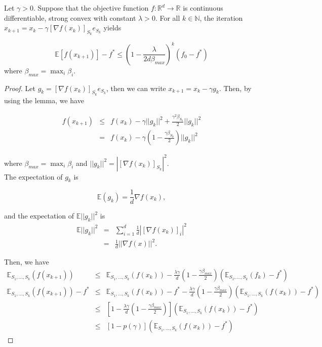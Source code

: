 \documentclass[12pt]{report}
\begin{document}
\begin{theorem}
Let $\gamma >0$. Suppose that the objective function $f: \mathbb{R}^d \to \mathbb{R}$ is continuous differentiable, strong convex with constant $\lambda >0$. For all $k \in \mathbb{N}$, the iteration $x_{k+1} = x_{k} - \gamma [\nabla f(x_k)]_{S_k} e_{S_k}$ yields 

$$\mathbb{E} [f(x_{k+1})]-f^* \leq (1- \frac{\lambda}{2d \beta_{max}})^k (f_0-f^*)$$
where $\beta_{max} = \max_i \beta_i$.

\end{theorem}


\begin{proof}
Let $g_k = [\nabla f(x_k)]_{S_k} e_{S_k}$, then we can write $x_{k+1} = x_{k} - \gamma g_k$.
Then, by using the lemma, we have

\begin{eqnarray*}
f(x_{k+1}) &\leq& f(x_k) - \gamma ||g_k||^2 + \frac{\gamma^2\beta_{S_k}}{2} ||g_k||^2\\
 & = & f(x_k) - \gamma (1-\frac{\gamma \beta_{S_k}}{2}) ||g_k||^2
\end{eqnarray*}

where $\beta_{max} = \max_i \beta_i$ and $||g_k||^2 = |[\nabla f(x_k)]_{S_k}|^2.$\\

The expectation of $g_k$ is

$$\mathbb{E} (g_k) =\frac{1}{d} \nabla f(x_k),$$

and the expectation of $\mathbb{E} ||g_k||^2$ is
\begin{eqnarray*}
\mathbb{E} ||g_k||^2 &=& \sum_{i=1}^d \frac{1}{d} |[\nabla f(x_k)]_i|^2\\
&=&\frac{1}{d}||\nabla f(x)||^2.
\end{eqnarray*}

Then, we have
\begin{eqnarray*}
\mathbb{E}_{S_1,\dots, S_k} (f(x_{k+1}))&\leq& \mathbb{E}_{S_1,\dots, S_k}  (f(x_k)) - \frac{\lambda \gamma}{d} (1- \frac{\gamma \beta_{max}}{2}) (\mathbb{E}_{S_1,\dots, S_k} (f_k) - f^*)\\
\mathbb{E}_{S_1,\dots, S_k} (f(x_{k+1})) -f^* &\leq& \mathbb{E}_{S_1,\dots, S_k}  (f(x_k)) -f^*- \frac{\lambda \gamma}{d} (1- \frac{\gamma \beta_{max}}{2}) (\mathbb{E}_{S_1,\dots, S_k} (f(x_k)) - f^*)\\
&\leq& [1- \frac{\lambda \gamma}{d} (1- \frac{\gamma \beta_{max}}{2})] (\mathbb{E}_{S_1,\dots, S_k} (f(x_k)) - f^*)\\
&\leq& [1- p(\gamma)] (\mathbb{E}_{S_1,\dots, S_k} (f(x_k)) - f^*)
\end{eqnarray*}


\end{proof}
\end{document}

